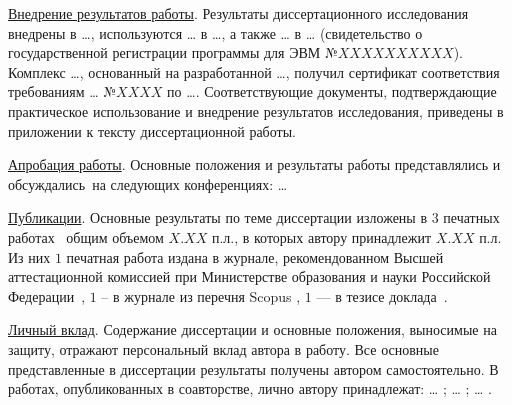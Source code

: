 \underline{Внедрение результатов работы}. Результаты диссертационного
исследования внедрены в \dots{}, используются \dots{} в \dots{}, а
также \dots{} в \dots{} (свидетельство о государственной регистрации
программы для ЭВМ №$XXXXXXXXXX$). Комплекс \dots{}, основанный на
разработанной \dots{}, получил сертификат соответствия требованиям
\dots{} №$XXXX$ по \dots{}. Соответствующие документы, подтверждающие
практическое использование и внедрение результатов исследования,
приведены в приложении к тексту диссертационной работы.

\underline{Апробация работы}. Основные положения и результаты работы
представлялись и обсуждались~на следующих конференциях: \dots{}

\underline{Публикации}. Основные результаты по теме диссертации
изложены в $3$ печатных работах~\cite{article_pub, article_vak,
  article_scopus} общим объемом $X.XX$ п.л., в которых автору
принадлежит $X.XX$ п.л. Из них $1$ печатная работа издана в журнале,
рекомендованном Высшей аттестационной комиссией при Министерстве
образования и науки Российской Федерации~\cite{article_vak}, $1$ -- в
журнале из перечня Scopus \cite{article_scopus}, $1$ --- в тезисе
доклада~\cite{article_pub}.

\underline{Личный вклад}. Содержание диссертации и основные положения,
выносимые на защиту, отражают персональный вклад автора в работу. Все
основные представленные в диссертации результаты получены автором
самостоятельно. В работах, опубликованных в соавторстве, лично автору
принадлежат: \dots{} \cite{article_pub}; \dots{} \cite{article_vak};
\dots{} \cite{article_scopus}.

